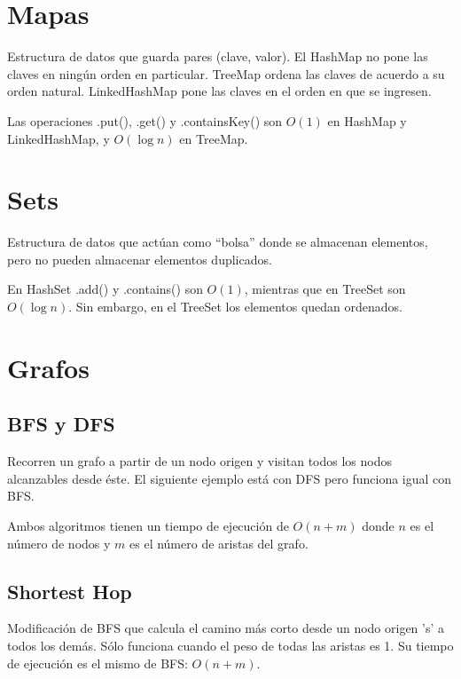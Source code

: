 \documentclass{article}
\begin{document}
\begin{multicols}{2}
\section{Mapas}
Estructura de datos que guarda pares (clave, valor). El HashMap no pone las claves en ningún orden en particular. TreeMap ordena las claves de acuerdo a su orden natural. LinkedHashMap pone las claves en el orden en que se ingresen.

Las operaciones .put(), .get() y .containsKey() son \( O(1) \) en HashMap y LinkedHashMap, y \( O(\log n)\) en TreeMap.


\section{Sets}
Estructura de datos que actúan como ``bolsa'' donde se almacenan elementos, pero no pueden almacenar elementos duplicados.

En HashSet .add() y .contains() son \( O(1) \), mientras que en TreeSet son \( O(\log n)\). Sin embargo, en el TreeSet los elementos quedan ordenados.


\section{Grafos}
	\subsection{BFS y DFS}
	Recorren un grafo a partir de un nodo origen y visitan todos los nodos alcanzables desde éste. El siguiente ejemplo está con DFS pero funciona igual con BFS. 
	
	Ambos algoritmos tienen un tiempo de ejecución de \( O(n + m) \) donde \( n \) es el número de nodos y \( m \) es el número de aristas del grafo.
	

	\subsection{Shortest Hop}
	Modificación de BFS que calcula el camino más corto desde un nodo origen 's' a todos los demás. Sólo funciona cuando el peso de todas las aristas es 1. Su tiempo de ejecución es el mismo de BFS: \( O(n + m) \).
	
	

\end{multicols}
\end{document}

